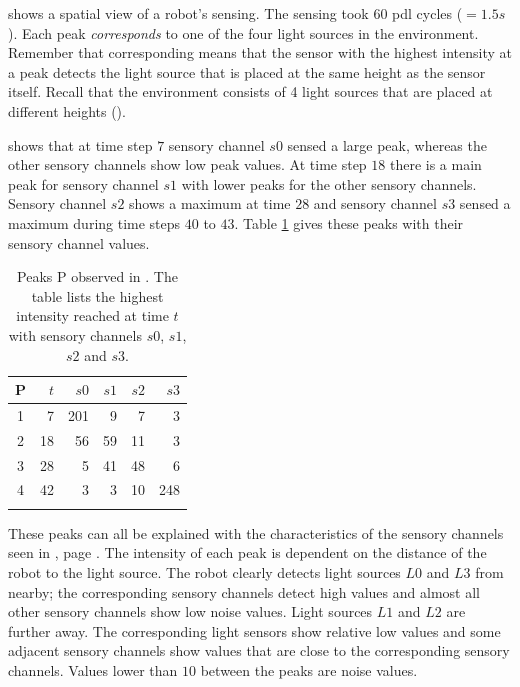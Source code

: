 
 shows a spatial view of a robot's sensing. The sensing took 60 {\sc pdl} cycles ($=1.5 s$). Each peak {\em corresponds} to one of the four light sources in the environment. Remember that corresponding means that the sensor with the highest intensity at a peak detects the light source that is placed at the same height as the sensor itself. Recall that the environment consists of 4 light sources that are placed at different heights (). 

 shows that at time step $7$ sensory channel $s0$ sensed a large peak, whereas the other sensory channels show low peak values. At time step $18$ there is a main peak  for sensory channel $s1$ with lower peaks for the other sensory channels. Sensory channel $s2$ shows a maximum at time $28$ and sensory channel $s3$ sensed a maximum during time steps $40$ to $43$. Table \ref{t:perception1} gives these peaks with their sensory channel values.

\begin{table}
\centering
\begin{tabular}{crrrrr}
\lsptoprule
P & $t$ & $s0$ & $s1$ & $s2$ & $s3$\\
\midrule
1 & 7 & 201 & 9 & 7 & 3\\
2 & 18 & 56 & 59 & 11 & 3\\
3 & 28 & 5 & 41 & 48 & 6\\
4 & 42 & 3 & 3 & 10 & 248\\
\lspbottomrule
\end{tabular}
\caption{Peaks P observed in . The table lists the highest intensity reached at time $t$ with sensory channels $s0$, $s1$, $s2$ and $s3$.}
\label{t:perception1}
\end{table}

\newpage
These peaks can all be explained with the characteristics of the sensory channels seen in , page \pageref{f:robots:calibration}.  The intensity of each peak is dependent on the distance of the robot to the light source. The robot clearly detects light sources $L0$ and $L3$ from nearby; the corresponding sensory channels detect high values and almost all other sensory channels show low noise values. Light sources $L1$ and $L2$ are further away. The corresponding light sensors show relative low values and some adjacent sensory channels show values that are close to the corresponding sensory channels. Values lower than $10$ between the peaks are noise values.

